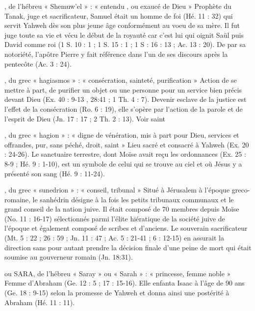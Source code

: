 \begin{multicols}{2}
, de l'hébreu « Shemuw'el » : « entendu , ou exaucé de Dieu »
Prophète du Tanak, juge et sacrificateur, Samuel était un homme de foi (Hé. 11 : 32) qui servit Yahweh dès son plus jeune âge conformément au voeu de sa mère. Il fut juge toute sa vie et vécu le début de la royauté car c'est lui qui oignit Saül puis David comme roi (1 S. 10 : 1 ; 1 S. 15 : 1 ; 1 S : 16 : 13 ; Ac. 13 : 20). De par sa notoriété, l'apôtre Pierre y fait référence dans l'un de ses discours après la pentecôte (Ac. 3 : 24).


, du grec « hagiasmos » : « consécration, sainteté, purification »
Action de se mettre à part, de purifier un objet ou une personne pour un service bien précis devant Dieu (Ex. 40 : 9-13 , 28:41 ; 1 Th. 4 : 7). Devenir esclave de la justice est l'effet de la consécration (Ro. 6 : 19), elle s'opère par l'action de la parole et de l'esprit de Dieu (Jn. 17 : 17 ; 2 Th. 2 : 13). Voir saint


, du grec « hagion » : « digne de vénération, mis à part pour Dieu, services et offrandes, pur, sans péché, droit, saint »
Lieu sacré et consacré à Yahweh (Ex. 20 : 24-26). Le sanctuaire terrestre, dont Moïse avait reçu les ordonnances (Ex. 25 : 8-9 ; Hé. 9 : 1-10), est un symbole de celui qui se trouve au ciel et où Jésus y a présenté son sang (Hé. 9 : 11-24).


, du grec « sunedrion » : « conseil, tribunal »
Situé à Jérusalem à l'époque greco-romaine, le sanhédrin désigne à la fois les petits tribunaux communaux et le grand conseil de la nation juive. Il était composé de 70 membres depuis Moïse (No. 11 : 16-17) sélectionnés parmi l'élite hiératique de la société juive de l'époque et également composé de scribes et d'anciens. Le souverain sacrificateur (Mt. 5 : 22 ; 26 : 59 ; Jn. 11 : 47 ; Ac. 5 : 21-41 ; 6 : 12-15) en assurait la direction sans pour autant prendre la décision finale d'une peine de mort qui était soumise au gouverneur romain (Jn. 18:31).


ou SARA, de l'hébreu « Saray » ou « Sarah » : « princesse, femme noble »
Femme d'Abraham (Ge. 12 : 5 ; 17 : 15-16). Elle enfanta Isaac à l'âge de 90 ans (Ge. 18 : 9-15) selon la promesse de Yahweh et donna ainsi une postérité à Abraham (Hé. 11 : 11).



\end{multicols}
